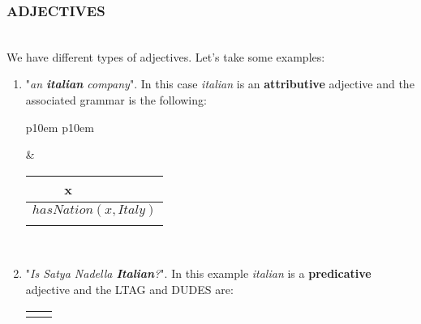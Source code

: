 \subsubsection{ADJECTIVES}\mbox{}\\
We have different types of adjectives. Let's take some examples:
\begin{enumerate}
\item "\textit{an \textbf{italian} company}". In this case \textit{italian} is an \textbf{attributive} adjective and the associated grammar is the following:
 \medskip
\begin{center}
\begin{tabular}{ p{10em} p{10em} }
	\label{tbl:grammar.attributiveAdjective}
	
	\begin{center}
		\begin{tikzpicture}
		\Tree [.NP [.ADJ italian ] [.NP$_1^\ast$ ] ]
		\end{tikzpicture}
	\end{center}
		
	&
	
	\begin{center}
		\begin{tabular}{|c|l|}
			\hline
			x & \mbox{}\\ 
			\hline
			\multicolumn{2}{|l|}{
				$hasNation(x,Italy)$
			} \\
			\hline
			\multicolumn{2}{|l|}{
				\mbox{}
			} \\
			\hline
		\end{tabular}
	\end{center}	
	\\
\end{tabular}
\end{center}
\medskip

\item "\textit{Is Satya Nadella \textbf{Italian}?}". In this example \textit{italian} is a  \textbf{predicative} adjective and the LTAG and DUDES are:
\medskip
\begin{center}
\begin{tabular}{ p{10em} p{10em} }
	\label{tbl:grammar.predicativeAdjective}
	
	\begin{center}
		\begin{tikzpicture}
		\Tree [.DP  [.NP [.ADJ italian ] ] ]
		\end{tikzpicture}
	\end{center}
		

\end{tabular}
\end{center}
\end{enumerate}

